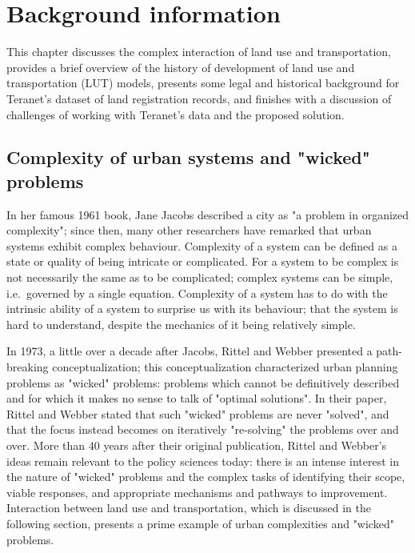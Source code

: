 \chapter[Background information]{Background information} \label{ch:background}

This chapter discusses the complex interaction of land use and transportation, provides a brief overview of the history of development of land use and transportation (LUT) models, presents some legal and historical background for Teranet's dataset of land registration records, and finishes with a discussion of challenges of working with Teranet's data and the proposed solution.

\section{Complexity of urban systems and "wicked" problems} \label{sec:complexity_and_wicked_problems}

In her famous 1961 book, Jane Jacobs\cite{Jacobs1961} described a city as "a problem in organized complexity";
since then, many other researchers have remarked that urban systems exhibit complex behaviour\cite{Batty2008, Bettencourt2013}.
Complexity of a system can be defined as a state or quality of being intricate or complicated.
For a system to be complex is not necessarily the same as to be complicated;
complex systems can be simple, i.e.\ governed by a single equation.
Complexity of a system has to do with the intrinsic ability of a system to surprise us with its behaviour;
that the system is hard to understand, despite the mechanics of it being relatively simple.

In 1973, a little over a decade after Jacobs, Rittel and Webber\cite{Rittel1973} presented a path-breaking conceptualization;
this conceptualization characterized urban planning problems as "wicked" problems: problems which cannot be definitively described and for which it makes no sense to talk of "optimal solutions".
In their paper, Rittel and Webber stated that such "wicked" problems are never "solved", and that the focus instead becomes on iteratively "re-solving" the problems over and over.
More than 40 years after their original publication, Rittel and Webber's ideas remain relevant to the policy sciences today: there is an intense interest in the nature of "wicked" problems and the complex tasks of identifying their scope, viable responses, and appropriate mechanisms and pathways to improvement\cite{Crowley2017}.
Interaction between land use and transportation, which is discussed in the following section, presents a prime example of urban complexities and "wicked" problems.

